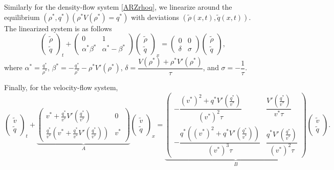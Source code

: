 \documentclass[preprint]{elsarticle}
\begin{document}
Similarly for the density-flow system \eqref{ARZrhoq}, we linearize around the equilibrium $(\rho^*, q^*)(\rho^*V(\rho^*) = q^*)$ with deviations $(\tilde{\rho}(x,t), \tilde{q}(x,t))$. The linearized system is as follows 
\begin{equation} \label{rhoqlin}
\begin{pmatrix}
\tilde{\rho} \\ \tilde{q}
\end{pmatrix}_t
+ \begin{pmatrix}
0 & 1 \\
\alpha^* \beta^* & \alpha^* - \beta^* 
\end{pmatrix}
\begin{pmatrix}
\tilde{\rho} \\ \tilde{q}
\end{pmatrix}_x = 
\begin{pmatrix}
0 & 0 \\
\delta & \sigma
\end{pmatrix}
\begin{pmatrix}
\tilde{\rho} \\ \tilde{q}
\end{pmatrix},
\end{equation}
where $\alpha^* = \frac{q^*}{\rho^*}$, $\beta^* = -\frac{q^*}{\rho^*} - \rho^* V'(\rho^*)$, $\delta = \dfrac{V(\rho^*)+\rho^*V'( \rho^*)}{\tau}$, and $\sigma = -\dfrac{1}{\tau}$.

Finally, for the velocity-flow system, 
\begin{equation} \label{vqlin}
\begin{pmatrix}
\tilde{v} \\ \tilde{q}
\end{pmatrix}_t
+ 
\underset{A}{
	\underbrace{
		\begin{pmatrix}
		v^* + \frac{q^*}{v^*} V'\left(\frac{q^*}{v^*}\right) & 0 \\
		\frac{q^*}{v^*} \left( v^* + \frac{q^*}{v^*} V'\left(\frac{q^*}					{v^*}\right)\right) & v^*
		\end{pmatrix}
	}
}
\begin{pmatrix}
\tilde{v} \\ \tilde{q}
\end{pmatrix}_x 
= 
\underset{B}{
	\underbrace{
		\begin{pmatrix}
		-\dfrac{(v^*)^2+q^*V'\left(\frac{q^*}{v^*}\right)}{(v^*)^2 \tau} & 				\dfrac{V'\left(\frac{q^*}{v^*}\right)}{v^* \tau} \\
		-\dfrac{q^*\left((v^*)^2 + q^*V'\left(\frac{q^*}{v^*}\right)\right)}{(v^*)^3 \tau}  & \dfrac{q^*V'\left(\frac{q^*}{v^*}\right)}{(v^*)^2 \tau}
		\end{pmatrix}
	}
}
\begin{pmatrix}
\tilde{v} \\ \tilde{q}
\end{pmatrix}.
\end{equation}
\end{document}
